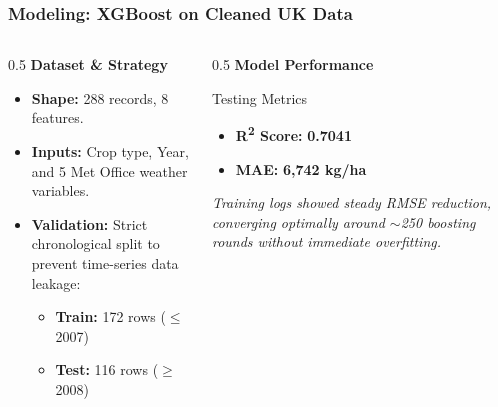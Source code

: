 \documentclass[aspectratio=169]{beamer}
\begin{document}
        \begin{frame}
        \frametitle{Modeling: XGBoost on Cleaned UK Data}
        \begin{columns}
            \begin{column}{0.5\textwidth}
                \textbf{Dataset \& Strategy}
                \begin{itemize}
                    \item \textbf{Shape:} 288 records, 8 features.
                    \item \textbf{Inputs:} Crop type, Year, and 5 Met Office weather variables.
                    \item \textbf{Validation:} Strict chronological split to prevent time-series data leakage:
                    \begin{itemize}
                        \item \textbf{Train:} 172 rows ($\le$ 2007)
                        \item \textbf{Test:} 116 rows ($\ge$ 2008)
                    \end{itemize}
                \end{itemize}
            \end{column}
            
            \begin{column}{0.5\textwidth}
                \textbf{Model Performance}
                \vspace{0.3cm}
                
                \begin{block}{Testing Metrics}
                    \begin{itemize}
                        \item \textbf{R\textsuperscript{2} Score:} \textbf{0.7041}
                        \item \textbf{MAE:} \textbf{6,742 kg/ha}
                    \end{itemize}
                \end{block}
                \vspace{0.3cm}
                \textit{Training logs showed steady RMSE reduction, converging optimally around $\sim$250 boosting rounds without immediate overfitting.}
            \end{column}
        \end{columns}
    \end{frame}
\end{document}
